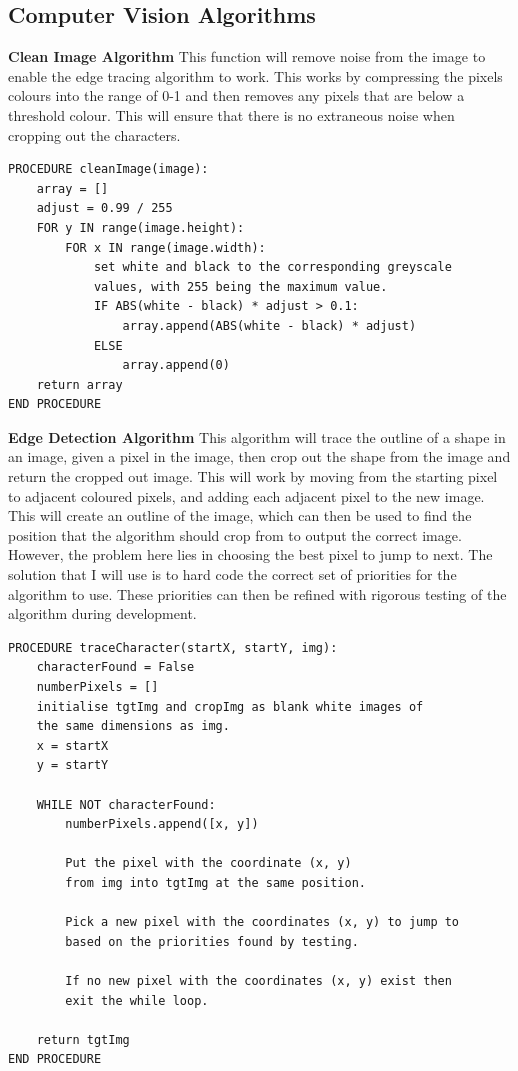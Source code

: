 \documentclass{report}
\begin{document}
\subsection{Computer Vision Algorithms}
\textbf{Clean Image Algorithm}
\newline
This function will remove noise from the image to enable the edge tracing algorithm to work. This works by compressing the pixels colours into the range of 0-1 and then removes any pixels that are below a threshold colour. This will ensure that there is no extraneous noise when cropping out the characters.
\begin{verbatim}
PROCEDURE cleanImage(image):
    array = []
    adjust = 0.99 / 255
    FOR y IN range(image.height):
        FOR x IN range(image.width):
            set white and black to the corresponding greyscale
            values, with 255 being the maximum value.
            IF ABS(white - black) * adjust > 0.1:
                array.append(ABS(white - black) * adjust)
            ELSE
                array.append(0)
    return array
END PROCEDURE
\end{verbatim}

\noindent \textbf{Edge Detection Algorithm}
\newline
This algorithm will trace the outline of a shape in an image, given a pixel in the image, then crop out the shape from the image and return the cropped out image.
\newline
This will work by moving from the starting pixel to adjacent coloured pixels, and adding each adjacent pixel to the new image. This will create an outline of the image, which can then be used to find the position that the algorithm should crop from to output the correct image.
\newline
However, the problem here lies in choosing the best pixel to jump to next. The solution that I will use is to hard code the correct set of priorities for the algorithm to use. These priorities can then be refined with rigorous testing of the algorithm during development.
\begin{verbatim}
PROCEDURE traceCharacter(startX, startY, img):
    characterFound = False
    numberPixels = []
    initialise tgtImg and cropImg as blank white images of
    the same dimensions as img.
    x = startX
    y = startY
    
    WHILE NOT characterFound:
        numberPixels.append([x, y])

        Put the pixel with the coordinate (x, y) 
        from img into tgtImg at the same position.
        
        Pick a new pixel with the coordinates (x, y) to jump to
        based on the priorities found by testing.
        
        If no new pixel with the coordinates (x, y) exist then
        exit the while loop.
    
    return tgtImg
END PROCEDURE
\end{verbatim}
\newpage
\end{document}
